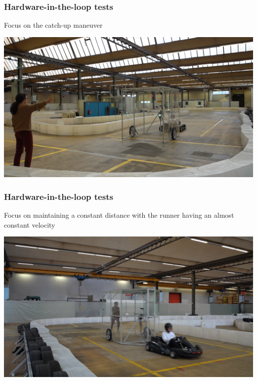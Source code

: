 \documentclass[9pt, aspectratio=169]{beamer}
\begin{document}
\begin{frame}
\frametitle{Hardware-in-the-loop tests}
\centering
Focus on the catch-up maneuver
\begin{center}
\href{video.mp4}{
\includegraphics[scale=0.25]
{Poster2}}
\end{center}
\end{frame}

\begin{frame}
\frametitle{Hardware-in-the-loop tests}
\centering
Focus on maintaining a constant distance with the runner having an almost constant velocity
\begin{center}
\href{Double.mp4}{
\includegraphics[scale=0.25]
{Poster}}
\end{center}

\end{frame}
\end{document}
